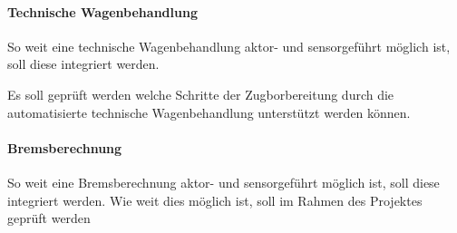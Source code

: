 \paragraph{Technische Wagenbehandlung}
\begin{feat}
So weit eine \gls{technische Wagenbehandlung} aktor- und sensorgeführt möglich ist, soll diese integriert werden.
\end{feat}
\begin{feat}
Es soll geprüft werden welche Schritte der Zugborbereitung durch die automatisierte \gls{technische Wagenbehandlung}  unterstützt werden können.
\end{feat}

\paragraph{Bremsberechnung}
\begin{feat}
So weit eine Bremsberechnung aktor- und sensorgeführt möglich ist, soll diese integriert werden. Wie weit dies möglich ist, soll im Rahmen des Projektes geprüft werden
\end{feat}


